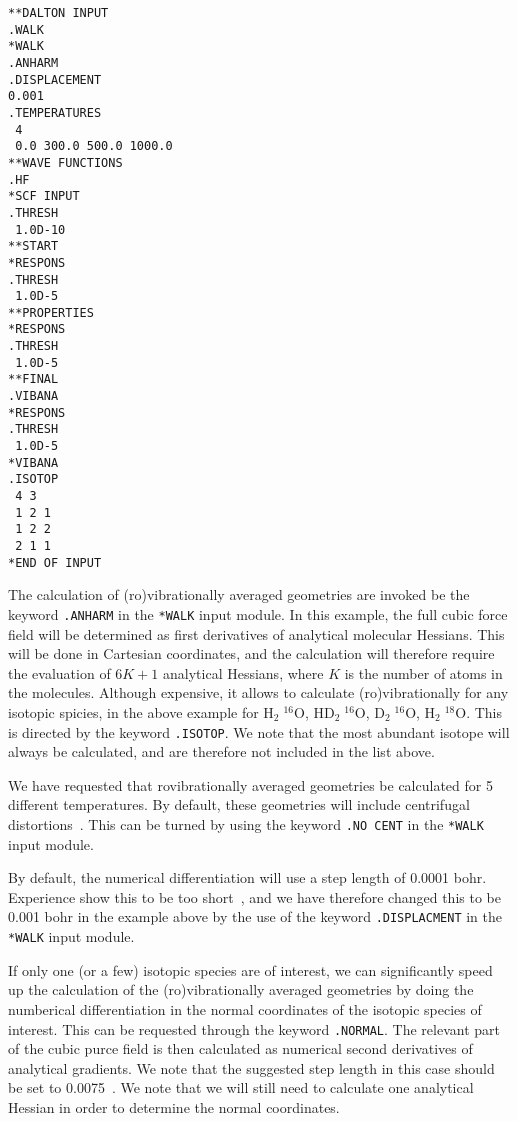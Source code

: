 \begin{verbatim}
**DALTON INPUT
.WALK
*WALK
.ANHARM
.DISPLACEMENT
0.001
.TEMPERATURES
 4
 0.0 300.0 500.0 1000.0
**WAVE FUNCTIONS
.HF
*SCF INPUT
.THRESH
 1.0D-10
**START
*RESPONS
.THRESH
 1.0D-5
**PROPERTIES
*RESPONS
.THRESH
 1.0D-5
**FINAL
.VIBANA
*RESPONS
.THRESH
 1.0D-5
*VIBANA
.ISOTOP
 4 3
 1 2 1
 1 2 2
 2 1 1
*END OF INPUT
\end{verbatim}

The calculation of (ro)vibrationally averaged geometries are invoked
be the keyword \verb|.ANHARM| in the \verb|*WALK| input module. In
this example, the full cubic force field will be determined as 
first derivatives of analytical molecular Hessians. This will be done
in Cartesian coordinates, and the calculation will therefore require
the evaluation of $6K + 1$ analytical Hessians, where $K$ is the
number of atoms in the molecules. Although expensive, it allows to
calculate (ro)vibrationally for any isotopic spicies, in the above
example for H$_2\;^{16}$O, HD$_2\;^{16}$O, D$_2\;^{16}$O,
H$_2\;^{18}$O. This is directed by the keyword \verb|.ISOTOP|. We
note that the most abundant isotope will always be calculated, and are
therefore not included in the list above.

We have requested that rovibrationally averaged geometries be
calculated for 5 different temperatures. By default, these geometries
will include centrifugal distortions~\cite{krjljv}. This can be
turned by using the keyword \verb|.NO CENT| in the \verb|*WALK| input
module.

By default, the numerical differentiation will use a step length of
0.0001 bohr. Experience show this to be too short~\cite{poakrprtjcp112}, and we have
therefore changed this to be 0.001 bohr in the example above by the
use of the keyword \verb|.DISPLACMENT| in the \verb|*WALK| input
module.

If only one (or a few) isotopic species are of interest, we can significantly
speed up the calculation of the (ro)vibrationally averaged geometries
by doing the numberical differentiation in the normal coordinates of
the isotopic species of interest. This can be requested through the
keyword \verb|.NORMAL|. The relevant part of the cubic purce field is
then calculated as numerical second derivatives of analytical
gradients. We note that the suggested step length in this case should
be set to 0.0075~\cite{poakrprtjcp112}. We note that we will still need to calculate one
analytical Hessian in order to determine the normal coordinates.

